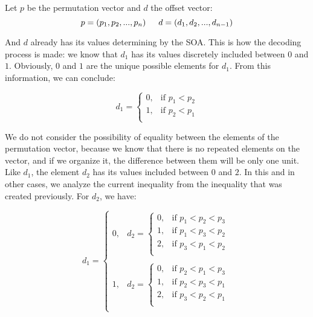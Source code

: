 \documentclass {amsart}
\begin{document}
Let {$p$} be the permutation vector and {$d$} the offset vector:
\begin{equation}
    p = (p_1, p_2, ..., p_n)  \indent d = (d_1, d_2, ..., d_{n-1})
\end{equation}

And {$d$} already has its values determining by the SOA. This is
how the decoding process is made: we know that {$d_1$} has its
values discretely included between {$0$} and {$1$}. Obviously,
{$0$} and {$1$} are the unique possible elements for {$d_1$}. From
this information, we can conclude:

\begin{displaymath}
d_1 = \left\{ \begin{array}{ll}
0, & \textrm{if $p_1 < p_2$}\\
1, & \textrm{if $p_2 < p_1$}\\
\end{array} \right.
\end{displaymath}
\newline

We do not consider the possibility of equality between the
elements of the permutation vector, because we know that there is
no repeated elements on the vector, and if we organize it, the
difference between them will be only one unit. Like {$d_1$}, the
element {$d_2$} has its values included between {$0$} and {$2$}.
In this and in other cases, we analyze the current inequality from
the inequality that was created previously. For {$d_2$}, we have:

\begin{displaymath}
d_1 = \left\{ \begin{array}{ll}
0, & d_2 = \left\{
\begin{array}{ll}
0, & \textrm{if $p_1 < p_2 < p_3$}\\
1, & \textrm{if $p_1 < p_3 < p_2$}\\
2, & \textrm{if $p_3 < p_1 < p_2$} \\
\end{array} \right.
\\\\
1, & d_2 = \left\{
\begin{array}{ll}
0, & \textrm{if $p_2 < p_1 < p_3$}\\
1, & \textrm{if $p_2 < p_3 < p_1$}\\
2, & \textrm{if $p_3 < p_2 < p_1$} \\
\end{array} \right.\\
\end{array} \right.
\end{displaymath}
\newline
\end{document}
